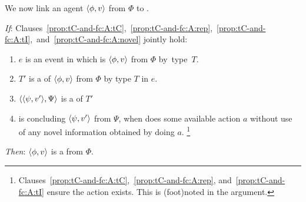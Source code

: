 \begin{note}
  We now link an agent \tCV{} \(\langle \phi, v \rangle\) from \(\Phi\) to .

  \begin{proposition}
    \label{prop:tC-and-fc}

    \noindent%

    \begin{itenum}
    \item[\emph{If}:]
      Clauses~\ref{prop:tC-and-fc:A:tC},~\ref{prop:tC-and-fc:A:rep},~\ref{prop:tC-and-fc:A:tI},~and~\ref{prop:tC-and-fc:A:novel} jointly hold:
      \begin{enumerate}[label=\arabic*., ref=(\arabic*)]
      \item
        \label{prop:tC-and-fc:A:tC}
        \(e\) is an event in which \vAgent{} is  \(\langle \phi, v \rangle\) from \(\Phi\) by~type~\(T\).
      \item
        \label{prop:tC-and-fc:A:rep}
        \(T'\) is a \tRep{} of \vAgent{} \tCV{} \(\langle \phi, v \rangle\) from \(\Phi\) by type \(T\) in \(e\).
      \item
        \label{prop:tC-and-fc:A:tI}
        \(\langle \langle \psi, v' \rangle, \Psi \rangle\) is a \tI{} of \(T'\)
      \item
        \label{prop:tC-and-fc:A:novel}
        \vAgent{} is concluding \(\langle \psi, v' \rangle\) from \(\Psi\), when \vAgent{} does some available action \(a\) without use of any novel information obtained by doing \(a\).%
        \footnote{
          Clauses~\ref{prop:tC-and-fc:A:tC},~\ref{prop:tC-and-fc:A:rep}, and~\ref{prop:tC-and-fc:A:tI} ensure the action exists.
          This is (foot)noted in the argument.
        }
      \end{enumerate}
    \item[\emph{Then}:]
      \(\langle \phi, v \rangle\) is a \fc{} from \(\Phi\).
    \end{itenum}
    \vspace{-\baselineskip}
  \end{proposition}


\end{note}
